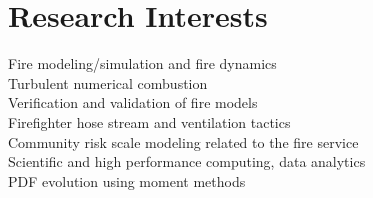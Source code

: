 \documentclass[10pt,letterpaper]{article}
\begin{document}
\section*{Research Interests}
Fire modeling/simulation and fire dynamics \\
Turbulent numerical combustion \\
Verification and validation of fire models \\
Firefighter hose stream and ventilation tactics \\
Community risk scale modeling related to the fire service \\
Scientific and high performance computing, data analytics \\
PDF evolution using moment methods \\

\bigskip
\end{document}
